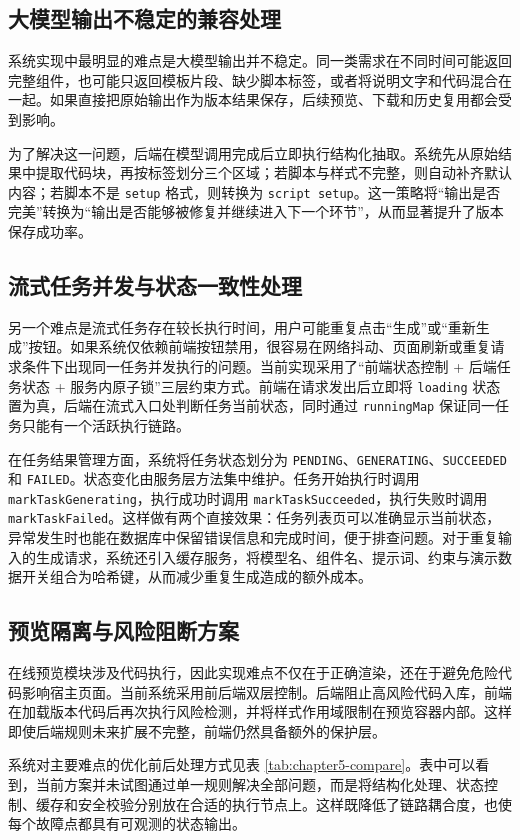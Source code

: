 \subsection{大模型输出不稳定的兼容处理}
系统实现中最明显的难点是大模型输出并不稳定。同一类需求在不同时间可能返回完整组件，也可能只返回模板片段、缺少脚本标签，或者将说明文字和代码混合在一起。如果直接把原始输出作为版本结果保存，后续预览、下载和历史复用都会受到影响。

为了解决这一问题，后端在模型调用完成后立即执行结构化抽取。系统先从原始结果中提取代码块，再按标签划分三个区域；若脚本与样式不完整，则自动补齐默认内容；若脚本不是 \texttt{setup} 格式，则转换为 \texttt{script setup}。这一策略将“输出是否完美”转换为“输出是否能够被修复并继续进入下一个环节”，从而显著提升了版本保存成功率。

\subsection{流式任务并发与状态一致性处理}
另一个难点是流式任务存在较长执行时间，用户可能重复点击“生成”或“重新生成”按钮。如果系统仅依赖前端按钮禁用，很容易在网络抖动、页面刷新或重复请求条件下出现同一任务并发执行的问题。当前实现采用了“前端状态控制 + 后端任务状态 + 服务内原子锁”三层约束方式。前端在请求发出后立即将 \texttt{loading} 状态置为真，后端在流式入口处判断任务当前状态，同时通过 \texttt{runningMap} 保证同一任务只能有一个活跃执行链路。

在任务结果管理方面，系统将任务状态划分为 \texttt{PENDING}、\texttt{GENERATING}、\texttt{SUCCEEDED} 和 \texttt{FAILED}。状态变化由服务层方法集中维护。任务开始执行时调用 \texttt{markTaskGenerating}，执行成功时调用 \texttt{markTaskSucceeded}，执行失败时调用 \texttt{markTaskFailed}。这样做有两个直接效果：任务列表页可以准确显示当前状态，异常发生时也能在数据库中保留错误信息和完成时间，便于排查问题。对于重复输入的生成请求，系统还引入缓存服务，将模型名、组件名、提示词、约束与演示数据开关组合为哈希键，从而减少重复生成造成的额外成本。

\subsection{预览隔离与风险阻断方案}
在线预览模块涉及代码执行，因此实现难点不仅在于正确渲染，还在于避免危险代码影响宿主页面。当前系统采用前后端双层控制。后端阻止高风险代码入库，前端在加载版本代码后再次执行风险检测，并将样式作用域限制在预览容器内部。这样即使后端规则未来扩展不完整，前端仍然具备额外的保护层。

系统对主要难点的优化前后处理方式见表 \ref{tab:chapter5-compare}。表中可以看到，当前方案并未试图通过单一规则解决全部问题，而是将结构化处理、状态控制、缓存和安全校验分别放在合适的执行节点上。这样既降低了链路耦合度，也使每个故障点都具有可观测的状态输出。


